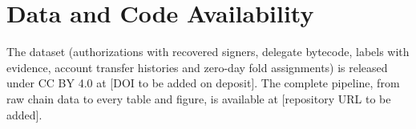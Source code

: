 \documentclass[journal]{IEEEtran}
\begin{document}
\section*{Data and Code Availability}
The dataset (authorizations with recovered signers, delegate bytecode, labels with evidence, account transfer histories and zero-day fold assignments) is released under CC BY 4.0 at [DOI to be added on deposit]. The complete pipeline, from raw chain data to every table and figure, is available at [repository URL to be added].

\balance


\end{document}
